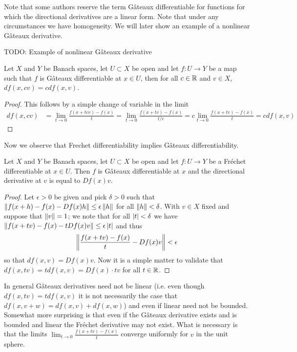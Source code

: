 Note that some authors reserve the term G\^{a}teaux differentiable for
functions for which the directional derivatives are a linear form.
Note that under any circumstances we have homogeneity.  We will later show an example of
a nonlinear G\^{a}teaux derivative.

TODO: Example of nonlinear G\^{a}teaux derivative

\begin{prop}\label{GateauxDerivativeHomogeneous}Let $X$ and $Y$ be
  Banach spaces, let $U \subset X$ be open and let $f : U \to Y$ be
  a map such that $f$ is G\^{a}teaux differentiable at $x \in U$, then
  for all $c \in \mathbb{R}$ and $v \in X$, $df(x,cv) = cdf(x,v)$.
\end{prop}
\begin{proof}
This follows by a simple change of variable in the limit
\begin{align*}
df(x,cv) &= \lim_{t \to  0} \frac{f(x + t c v) - f(x)}{t} = \lim_{t \to  0} \frac{f(x + t v) - f(x)}{t/c} = c \lim_{t \to  0} \frac{f(x + t v) - f(x)}{t} = c df(x,v)
\end{align*} 
\end{proof}


Now we observe that Frechet differentiability implies G\^{a}teaux differentiability.
\begin{prop}\label{FrechetDifferentiableImpliesGateauxDifferentiable}Let $X$ and $Y$ be Banach spaces, let $U \subset X$ be
  open and let $f : U \to Y$ be
  a Fr\'{e}chet differentiable at $x \in U$.  Then $f$ is G\^{a}teaux
  differentiable at $x$ and the directional derivative at $v$ is equal
  to $Df(x)v$.
\end{prop}
\begin{proof}
Let $\epsilon >0$ be given and pick $\delta>0$ such
that $\left \lVert f(x+h) - f(x) -Df(x)h \right \rVert \leq \epsilon \left \lVert h \right \rVert$ for all
$\left \lVert h \right \rVert < \delta$.  With $v \in X$ fixed and suppose that $\left \lVert v \right \rVert
= 1$; we note that for all
$\left \vert t \right \vert < \delta$ we have $\left \lVert f(x+tv) - f(x) - t Df(x) v \right \rVert
\leq \epsilon \left \vert t \right \vert $ and thus 
\begin{align*}
\left \lVert \frac{f(x+tv) - f(x) }{t} - Df(x) v \right \rVert < \epsilon
\end{align*}
so that $df(x,v) = Df(x) v$.  Now it is a simple matter to validate
that $df(x, tv) = t df(x,v) = Df(x) \cdot tv$ for all $t \in \mathbb{R}$.
\end{proof}
In general G\^{a}teaux derivatives need not be linear (i.e. even
though $df(x,tv) = tdf(x,v)$ it is not necessarily the case that
$df(x,v+w) = df(x,v) + df(x,w)$) and even if
linear need not be bounded.  Somewhat more surprising is that even if
the G\^{a}teaux derivative exists and is bounded and linear the
Fr\'{e}chet derivative may not exist.  What is necessary is that the
limits $\lim_{t \to 0} \frac{f(x+tv) -f(x)}{t}$ converge uniformly for
$v$ in the unit sphere.

